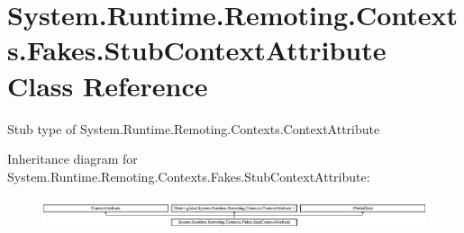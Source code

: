 \hypertarget{class_system_1_1_runtime_1_1_remoting_1_1_contexts_1_1_fakes_1_1_stub_context_attribute}{\section{System.\-Runtime.\-Remoting.\-Contexts.\-Fakes.\-Stub\-Context\-Attribute Class Reference}
\label{class_system_1_1_runtime_1_1_remoting_1_1_contexts_1_1_fakes_1_1_stub_context_attribute}
}


Stub type of System.\-Runtime.\-Remoting.\-Contexts.\-Context\-Attribute 


Inheritance diagram for System.\-Runtime.\-Remoting.\-Contexts.\-Fakes.\-Stub\-Context\-Attribute\-:\begin{figure}[H]
\begin{center}
\leavevmode
\includegraphics[height=0.938023cm]{class_system_1_1_runtime_1_1_remoting_1_1_contexts_1_1_fakes_1_1_stub_context_attribute}
\end{center}
\end{figure}
